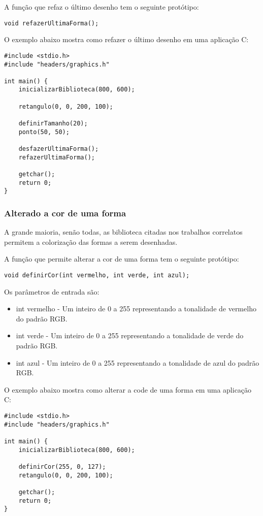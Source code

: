 \documentclass[12pt, %
openright,
oneside, %
a4paper,    %
brazil]{facom-ufu-abntex2}
\begin{document}
A função que refaz o último desenho tem o seguinte protótipo:

\begin{lstlisting}
void refazerUltimaForma();
\end{lstlisting}

O exemplo abaixo mostra como refazer o último desenho em uma aplicação C:

\begin{lstlisting}
#include <stdio.h>
#include "headers/graphics.h"

int main() {
    inicializarBiblioteca(800, 600);

    retangulo(0, 0, 200, 100);
    
    definirTamanho(20);
    ponto(50, 50);

    desfazerUltimaForma();
    refazerUltimaForma();

    getchar();
    return 0;
}
\end{lstlisting}

\subsubsection{Alterado a cor de uma forma}
A grande maioria, senão todas, as biblioteca citadas nos trabalhos correlatos permitem a colorização das formas a serem desenhadas.

A função que permite alterar a cor de uma forma tem o seguinte protótipo:

\begin{lstlisting}
void definirCor(int vermelho, int verde, int azul);
\end{lstlisting}

Os parâmetros de entrada são:

\begin{itemize}
    \item int vermelho - Um inteiro de 0 a 255 representando a tonalidade de vermelho do padrão RGB.
    \item int verde - Um inteiro de 0 a 255 representando a tonalidade de verde do padrão RGB.
    \item int azul - Um inteiro de 0 a 255 representando a tonalidade de azul do padrão RGB.
\end{itemize}

O exemplo abaixo mostra como alterar a code de uma forma em uma aplicação C:

\begin{lstlisting}
#include <stdio.h>
#include "headers/graphics.h"

int main() {
    inicializarBiblioteca(800, 600);

    definirCor(255, 0, 127);
    retangulo(0, 0, 200, 100);

    getchar();
    return 0;
}
\end{lstlisting}
\end{document}
